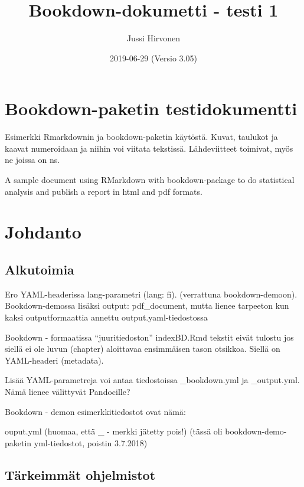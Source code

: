 \documentclass[finnish,]{book}
\title{Bookdown-dokumetti - testi 1}
\author{Jussi Hirvonen}
\date{2019-06-29 (Versio 3.05)}
\begin{document}
\maketitle

{
\setcounter{tocdepth}{1}
\tableofcontents
}
\hypertarget{bookdown-paketin-testidokumentti}{%
\chapter{Bookdown-paketin testidokumentti}\label{bookdown-paketin-testidokumentti}}

Esimerkki Rmarkdownin ja bookdown-paketin käytöstä. Kuvat, taulukot ja kaavat numeroidaan ja niihin voi viitata tekstissä. Lähdeviitteet toimivat, myös ne joissa on ns.

A sample document using RMarkdown with bookdown-package to do statistical analysis and publish a report in html and pdf formats.

\hypertarget{johdanto}{%
\chapter{Johdanto}\label{johdanto}}

\hypertarget{alkutoimia}{%
\section{Alkutoimia}\label{alkutoimia}}

Ero YAML-headerissa lang-parametri (lang: fi). (verrattuna bookdown-demoon).
Bookdown-demossa lisäksi output: pdf\_document, mutta lienee tarpeeton kun kaksi outputformaattia annettu output.yaml-tiedostossa

Bookdown - formaatissa ``juuritiedoston'' indexBD.Rmd tekstit eivät tulostu jos siellä ei ole luvun (chapter) aloittavaa ensimmäisen tason otsikkoa. Siellä on YAML-headeri (metadata).

Lisää YAML-parametreja voi antaa tiedostoissa \_bookdown.yml ja \_output.yml. Nämä lienee välittyvät Pandocille?

Bookdown - demon esimerkkitiedostot ovat nämä:

ouput.yml (huomaa, että \_ - merkki jätetty pois!) (tässä oli bookdown-demo-paketin yml-tiedostot, poistin 3.7.2018)

\hypertarget{tarkeimmat-ohjelmistot}{%
\section{Tärkeimmät ohjelmistot}\label{tarkeimmat-ohjelmistot}}
\end{document}
